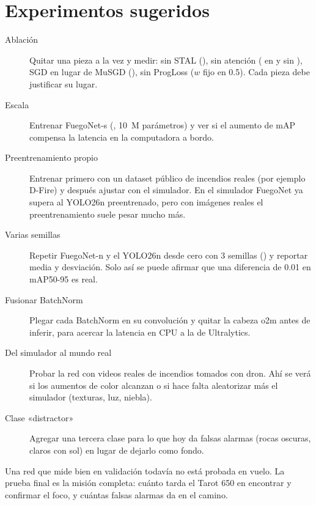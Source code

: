 \section{Experimentos sugeridos}

\begin{description}
  \item[Ablación] Quitar una pieza a la vez y medir: sin STAL (),
        sin atención ( en  y sin ), SGD en
        lugar de MuSGD (), sin ProgLoss ($w$ fijo en 0.5). Cada
        pieza debe justificar su lugar.
  \item[Escala] Entrenar FuegoNet-s (, 10~M parámetros) y ver si el
        aumento de mAP compensa la latencia en la computadora a bordo.
  \item[Preentrenamiento propio] Entrenar primero con un dataset público de incendios
        reales (por ejemplo D-Fire) y después ajustar con el simulador. En el simulador
        FuegoNet ya supera al YOLO26n preentrenado, pero con imágenes reales el
        preentrenamiento suele pesar mucho más.
  \item[Varias semillas] Repetir FuegoNet-n y el YOLO26n desde cero con 3 semillas
        () y reportar media y desviación. Solo así se puede afirmar que
        una diferencia de 0.01 en mAP50-95 es real.
  \item[Fusionar BatchNorm] Plegar cada BatchNorm en su convolución y quitar la cabeza
        o2m antes de inferir, para acercar la latencia en CPU a la de Ultralytics.
  \item[Del simulador al mundo real] Probar la red con videos reales de incendios
        tomados con dron. Ahí se verá si los aumentos de color alcanzan o si hace
        falta aleatorizar más el simulador (texturas, luz, niebla).
  \item[Clase «distractor»] Agregar una tercera clase para lo que hoy da falsas
        alarmas (rocas oscuras, claros con sol) en lugar de dejarlo como fondo.
\end{description}

\begin{recuerda}
Una red que mide bien en validación todavía no está probada en vuelo. La prueba
final es la misión completa: cuánto tarda el Tarot 650 en encontrar y confirmar
el foco, y cuántas falsas alarmas da en el camino.
\end{recuerda}
